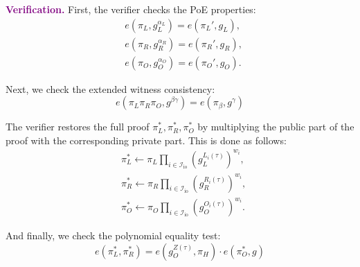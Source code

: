 \documentclass[../lecture-notes.tex]{subfiles}
\begin{document}
\textcolor{purple}{\textbf{Verification.}} First, the verifier checks the PoE properties:
\begin{equation*}
    \begin{aligned}
        &e(\pi_L, g_L^{\alpha_L}) = e(\pi_L', g_L), \\ & e(\pi_R, g_R^{\alpha_R}) = e(\pi_R', g_R), \\ & e(\pi_O, g_O^{\alpha_O}) = e(\pi_O', g_O).
    \end{aligned}
\end{equation*}

Next, we check the extended witness consistency:
\begin{equation*}
    e(\pi_L\pi_R\pi_O, g^{\beta\gamma}) = e(\pi_{\beta}, g^{\gamma})
\end{equation*}

The verifier restores the full proof $\pi_L^*,\pi_R^*,\pi_O^*$ by multiplying the public part of the proof with the corresponding private part. This is done as follows:
\begin{equation*}
    \begin{aligned}
        & \pi_L^* \gets \pi_L\prod_{i \in \mathcal{I}_{\text{io}}} (g_L^{L_i(\tau)})^{w_i}, \\ 
        & \pi_R^* \gets \pi_R\prod_{i \in \mathcal{I}_{\text{io}}} (g_R^{R_i(\tau)})^{w_i}, \\
        & \pi_O^* \gets \pi_O\prod_{i \in \mathcal{I}_{\text{io}}} (g_O^{O_i(\tau)})^{w_i}.        
    \end{aligned}
\end{equation*}

And finally, we check the polynomial equality test:
\begin{equation*}
    e(\pi_L^*, \pi_R^*) = e(g_O^{Z(\tau)}, \pi_H)\cdot e(\pi_O^*, g)
\end{equation*}
\end{document}
